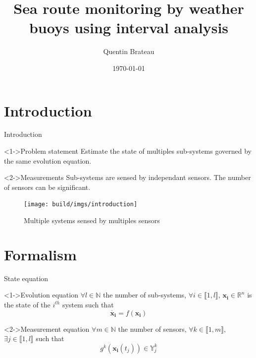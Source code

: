 \documentclass{beamer}
\title{Sea route monitoring by weather buoys using interval analysis}
\date{\today}
\author{Quentin Brateau}
\institute{ENSTA Bretagne}
\begin{document}
    \maketitle

    \section{Introduction}

        \begin{frame}{Introduction}
            \begin{minipage}{0.55\textwidth}
                \begin{block}<1->{Problem statement}
                    Estimate the state of multiples sub-systems governed by the same evolution equation.
                \end{block}
                \begin{block}<2->{Measurements}
                    Sub-systems are sensed by independant sensors. The number of sensors can be significant.
                \end{block}
            \end{minipage}
            \hfill
            \begin{minipage}{0.4\textwidth}
                \begin{figure}
                    \texttt{[image: build/imgs/introduction]}
                    \caption{Multiple systems sensed by multiples sensors}
                \end{figure}
            \end{minipage}
        \end{frame}

    \section{Formalism}

        \begin{frame}{State equation}
            \begin{block}<1->{Evolution equation}
                $\forall l \in \mathbb{N}$ the number of sub-systems, $\forall i \in \llbracket 1, l\rrbracket$, $\mathbf{x_i} \in \mathbb{R}^n$ is the state of the $i^{th}$ system such that
                \begin{equation}
                    \dot{\mathbf{x_i}} = f(\mathbf{x_i})
                \end{equation}
            \end{block}

            \begin{block}<2->{Measurement equation}
                $\forall m \in \mathbb{N}$ the number of sensors, $\forall k \in \llbracket 1, m\rrbracket$, $\exists j \in \llbracket 1, l\rrbracket$ such that
                \begin{equation}
                    g^k(\mathbf{x_i}(t_j)) \in \mathbb{Y}_j^k
                \end{equation}
            \end{block}
        \end{frame}
\end{document}
